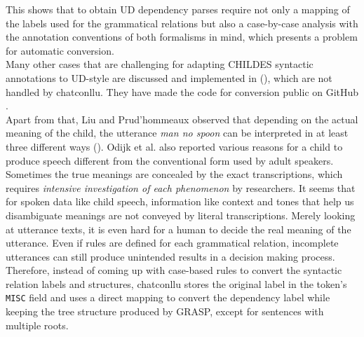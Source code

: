 This shows that to obtain UD dependency parses require not only a mapping of the labels used for the grammatical relations but also a case-by-case analysis with the annotation conventions of both formalisms in mind, which presents a problem for automatic conversion.\\

Many other cases that are challenging for adapting CHILDES syntactic annotations to UD-style are discussed and implemented in (\cite{liu2021}), which are not handled by chatconllu. They have made the code for conversion public on GitHub .\\

Apart from that, Liu and Prud’hommeaux observed that depending on the actual meaning of the child, the utterance \emph{man no spoon} can be interpreted in at least three different ways (\cite{liu2021}). Odijk et al. also reported various reasons for a child to produce speech different from the conventional form used by adult speakers. Sometimes the true meanings are concealed by the exact transcriptions, which requires \emph{intensive investigation of each phenomenon} by researchers. It seems that for spoken data like child speech, information like context and tones that help us disambiguate meanings are not conveyed by literal transcriptions. Merely looking at utterance texts, it is even hard for a human to decide the real meaning of the utterance. Even if rules are defined for each grammatical relation, incomplete utterances can still produce unintended results in a decision making process. Therefore, instead of coming up with case-based rules to convert the syntactic relation labels and structures, chatconllu stores the original label in the token's \texttt{MISC} field and uses a direct mapping to convert the dependency label while keeping the tree structure produced by GRASP, except for sentences with multiple roots.


